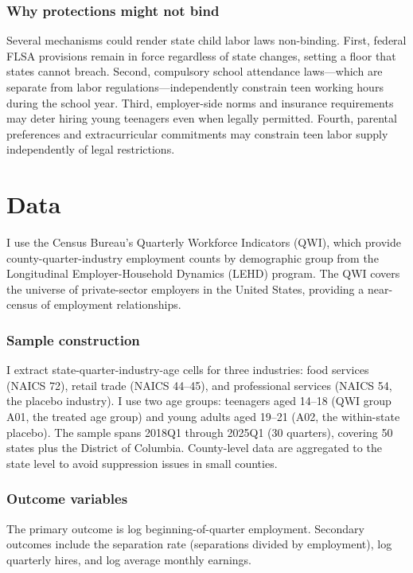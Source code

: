 \documentclass[12pt]{article}
\begin{document}
\subsubsection*{Why protections might not bind} Several mechanisms could render state child labor laws non-binding. First, federal FLSA provisions remain in force regardless of state changes, setting a floor that states cannot breach. Second, compulsory school attendance laws---which are separate from labor regulations---independently constrain teen working hours during the school year. Third, employer-side norms and insurance requirements may deter hiring young teenagers even when legally permitted. Fourth, parental preferences and extracurricular commitments may constrain teen labor supply independently of legal restrictions.

\section{Data}\label{sec:data}

I use the Census Bureau's Quarterly Workforce Indicators (QWI), which provide county-quarter-industry employment counts by demographic group from the Longitudinal Employer-Household Dynamics (LEHD) program. The QWI covers the universe of private-sector employers in the United States, providing a near-census of employment relationships.

\subsubsection*{Sample construction} I extract state-quarter-industry-age cells for three industries: food services (NAICS 72), retail trade (NAICS 44--45), and professional services (NAICS 54, the placebo industry). I use two age groups: teenagers aged 14--18 (QWI group A01, the treated age group) and young adults aged 19--21 (A02, the within-state placebo). The sample spans 2018Q1 through 2025Q1 (30 quarters), covering 50 states plus the District of Columbia. County-level data are aggregated to the state level to avoid suppression issues in small counties.

\subsubsection*{Outcome variables} The primary outcome is log beginning-of-quarter employment. Secondary outcomes include the separation rate (separations divided by employment), log quarterly hires, and log average monthly earnings.
\end{document}

